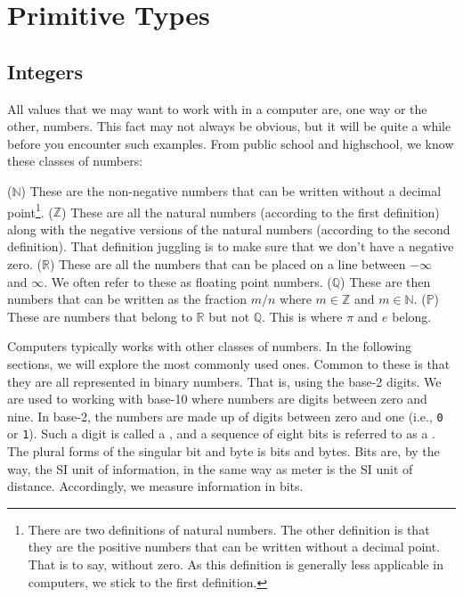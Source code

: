 \chapter{Primitive Types}

\section{Integers}

\label{sec:int}

All values that we may want to work with in a computer are, one way or the other, numbers. This fact may not always be obvious, but it will be quite a while before you encounter such examples. From public school and highschool, we know these classes of numbers:
\begin{itemize}
   ($\mathbb{N}$) These are the non-negative numbers that can be written without a decimal point\footnote{There are two definitions of natural numbers. The other definition is that they are the positive numbers that can be written without a decimal point. That is to say, without zero. As this definition is generally less applicable in computers, we stick to the first definition.}.
   ($\mathbb{Z}$) These are all the natural numbers (according to the first definition) along with the negative versions of the natural numbers (according to the second definition). That definition juggling is to make sure that we don't have a negative zero.
   ($\mathbb{R}$) These are all the numbers that can be placed on a line between $-\infty$ and $\infty$. We often refer to these as floating point numbers.
   ($\mathbb{Q}$) These are then numbers that can be written as the fraction $m/n$ where $m \in \mathbb{Z}$ and $m \in \mathbb{N}$.
   ($\mathbb{P}$) These are numbers that belong to $\mathbb{R}$ but not $\mathbb{Q}$. This is where $\pi$ and $e$ belong.
\end{itemize}
Computers typically works with other classes of numbers. In the following sections, we will explore the most commonly used ones. Common to these is that they are all represented in binary numbers. That is, using the base-2 digits. We are used to working with base-10 where numbers are digits between zero and nine. In base-2, the numbers are made up of digits between zero and one (i.e., \texttt{0} or \texttt{1}). Such a digit is called a , and a sequence of eight bits is referred to as a . The plural forms of the singular bit and byte is bits and bytes. Bits are, by the way, the SI unit of information, in the same way as meter is the SI unit of distance. Accordingly, we measure information in bits.

